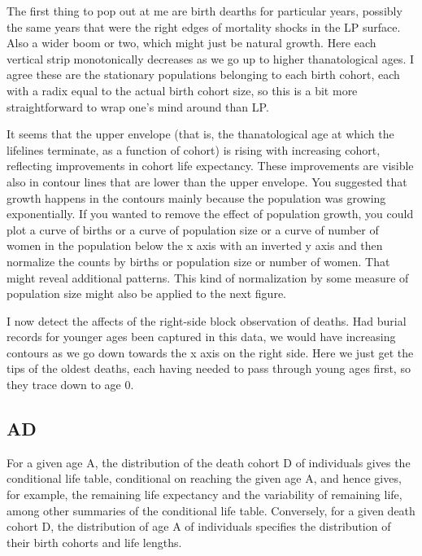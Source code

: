 The first thing to pop out at me are birth dearths for particular years,
possibly the same years that were the right edges of mortality shocks in the LP surface. Also a wider boom or two, which might just be natural growth. Here each vertical strip monotonically decreases as we go up to higher thanatological ages. I agree these are the stationary populations belonging to each birth cohort, each with a radix equal to the actual birth cohort size, so this is a bit more straightforward to wrap one's mind around than LP.

It seems that the upper envelope (that is, the thanatological
age at which the lifelines terminate, as a function of cohort) is rising with increasing cohort, reflecting improvements in cohort life expectancy.  These improvements are visible also in contour lines that are lower than the upper envelope.  You suggested that growth happens in the contours mainly because the population was growing exponentially.  If you wanted to remove the effect of population growth, you could plot a curve of births or a curve of population size or a curve of number of women in the population below the x axis with an inverted y axis and then normalize the counts by births or population size or number of women.  That might reveal additional patterns.  This kind of normalization by some measure of population size might also be applied to the next figure.

​I now detect the affects of the right-side block observation of deaths. Had burial records for younger ages been captured in this data, we would have increasing contours as we go down towards the x axis on the right side. Here we just get the tips of the oldest deaths, each having needed to pass through young ages first, so they trace down to age 0.​

\subsection{AD}

For a given age A, the distribution of the death cohort D of individuals gives
the conditional life table, conditional on reaching the given age A, and hence gives, for example, the remaining life
expectancy and the variability of remaining life, among other summaries of the
conditional life table. Conversely, for a given death cohort D, the distribution
of age A of individuals specifies the distribution of their birth cohorts and life lengths.

